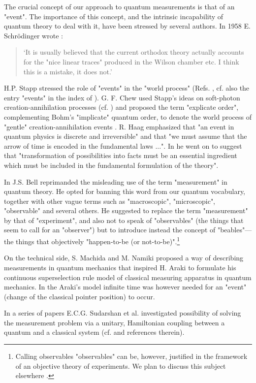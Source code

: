 \documentclass[12pt]{article}
\begin{document}
The crucial concept of our approach to quantum measurements is that of an
"event". The importance of this concept, and the intrinsic incapability of
quantum theory to deal with it, have been stressed by several authors. In
1958 E. Schr\"odinger wrote \cite{sch1}:
\begin{quotation} \lq It is usually believed that the current orthodox
theory actually accounts for the "nice linear traces" produced in the
Wilson chamber etc. I think this is a mistake, it does not.\rq
\end{quotation}
H.P. Stapp stressed the role of "events" in the "world process" (Refs.
\cite{stap2,stap3}, cf. also the entry "events" in the index of
\cite{stap4}). G. F. Chew used Stapp's ideas on soft-photon
creation-annihilation processes (cf. \cite{stap5}) and proposed the term
"explicate order", complementing Bohm's "implicate" quantum order, to
denote the world process of "gentle" creation-annihilation events
\cite{chew1}. R. Haag emphasized \cite{haag1} that "an event in quantum
physics is discrete and irreversible" and that "we must assume that the
arrow of time is encoded in the fundamental laws ...". In \cite{haag2} he
went on to suggest that "transformation of possibilities into facts must be
an essential ingredient which must be included in the fundamental
formulation of the theory".

In \cite{bel1,bel2} J.S. Bell reprimanded the misleading use of the term
"measurement" in quantum theory. He opted for banning this word from our
quantum vocabulary, together with other vague terms such as "macroscopic",
"microscopic", "observable" and several others. He suggested to replace the
term "measurement" by that of "experiment", and also not to speak of
"observables" (the things that seem to call for an "observer") but to
introduce instead the concept of "beables"---the things that objectively
"happen-to-be (or not-to-be)".\footnote{Calling observables
"observables" can be, however, justified in the framework of an objective
theory of experiments. We plan to discuss this subject elsewhere .}

On the technical side, S. Machida and M. Namiki \cite{mach1} proposed a way
of describing measurements in quantum mechanics that inspired H. Araki
\cite{ara1,ara2} to formulate his continuous superselection rule model of
classical measuring apparatus in quantum mechanics. In the Araki's model
infinite time was however needed for an "event" (change of the classical
pointer position) to occur.

In a series of papers E.C.G. Sudarshan et al.  investigated possibility
of solving the measurement problem via a unitary, Hamiltonian
coupling between a quantum and a classical system (cf. \cite{su1} and
references therein).
\end{document}
